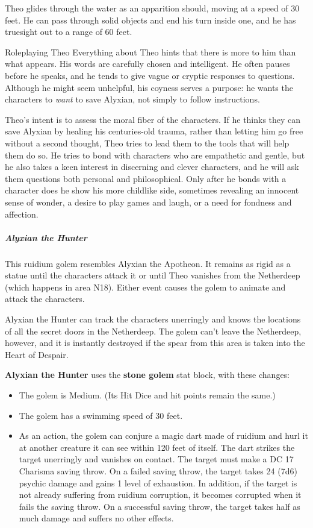 \documentclass[10pt,a4paper,twoside,fancy,bg=print,twocolumn,openany,nodeprecatedcode]{dndbook}
\begin{document}
Theo glides through the water as an apparition should, moving at a speed of 30 feet. He can pass through solid objects and end his turn inside one, and he has truesight out to a range of 60 feet.

\begin{DndSidebar}[float=!b]{Roleplaying Theo}
Everything about Theo hints that there is more to him than what appears. His words are carefully chosen and intelligent. He often pauses before he speaks, and he tends to give vague or cryptic responses to questions. Although he might seem unhelpful, his coyness serves a purpose: he wants the characters to \textit{want} to save Alyxian, not simply to follow instructions.



Theo's intent is to assess the moral fiber of the characters. If he thinks they can save Alyxian by healing his centuries-old trauma, rather than letting him go free without a second thought, Theo tries to lead them to the tools that will help them do so. He tries to bond with characters who are empathetic and gentle, but he also takes a keen interest in discerning and clever characters, and he will ask them questions both personal and philosophical. Only after he bonds with a character does he show his more childlike side, sometimes revealing an innocent sense of wonder, a desire to play games and laugh, or a need for fondness and affection.



\end{DndSidebar}

\subparagraph{Alyxian the Hunter}
This ruidium golem resembles Alyxian the Apotheon. It remains as rigid as a statue until the characters attack it or until Theo vanishes from the Netherdeep (which happens in area N18). Either event causes the golem to animate and attack the characters.

Alyxian the Hunter can track the characters unerringly and knows the locations of all the secret doors in the Netherdeep. The golem can't leave the Netherdeep, however, and it is instantly destroyed if the spear from this area is taken into the Heart of Despair.

\textbf{Alyxian the Hunter} uses the \textbf{stone golem} stat block, with these changes:


\begin{itemize}
\item The golem is Medium. (Its Hit Dice and hit points remain the same.)
\item The golem has a swimming speed of 30 feet.
\item As an action, the golem can conjure a magic dart made of ruidium and hurl it at another creature it can see within 120 feet of itself. The dart strikes the target unerringly and vanishes on contact. The target must make a DC 17 Charisma saving throw. On a failed saving throw, the target takes 24 (7d6) psychic damage and gains 1 level of exhaustion. In addition, if the target is not already suffering from ruidium corruption, it becomes corrupted when it fails the saving throw. On a successful saving throw, the target takes half as much damage and suffers no other effects.
\end{itemize}
\end{document}
